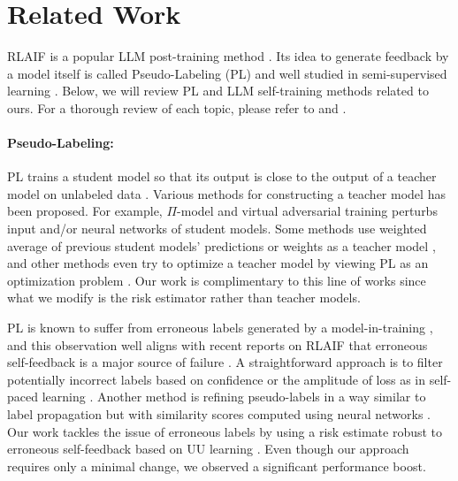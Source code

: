 \section{Related Work}

RLAIF is a popular LLM post-training method \citep{bai2022constitutional}.
Its idea to generate feedback by a model itself is called Pseudo-Labeling (PL) and well studied in semi-supervised learning \citep{scudder1965probability,lee2013pseudo}. Below, we will review PL and LLM self-training methods related to ours. For a thorough review of each topic, please refer to \citet{yang2023survey} and \citet{xiao2025foundations}.

\paragraph{Pseudo-Labeling:}
PL trains a student model so that its output is close to the output of a teacher model on unlabeled data \citep{scudder1965probability,lee2013pseudo}.
Various methods for constructing a teacher model has been proposed.
For example, $\Pi$-model \citep{bachman2014learning,sajjadi2016regularization,laine2017temporal} and virtual adversarial training \citep{miyato2019virtual} perturbs input and/or neural networks of student models.
Some methods use weighted average of previous student models' predictions or weights as a teacher model \citep{laine2017temporal,tarvainen2017mean}, and
other methods even try to optimize a teacher model by viewing PL as an optimization problem \citep{yi2019probabilistic,wang2020repetitive,pham2021meta}.
Our work is complimentary to this line of works since what we modify is the risk estimator rather than teacher models.

PL is known to suffer from erroneous labels generated by a model-in-training \citep{haase2021iterative,rizve2021in}, and this observation well aligns with recent reports on RLAIF that erroneous self-feedback is a major source of failure \citep{Madaan2023-fn}.
A straightforward approach is to filter potentially incorrect labels based on confidence \citep{sohn2020fixmatch,haase2021iterative,rizve2021in} or the amplitude of loss as in self-paced learning \citep{bengio2009curriculum,kumar2010self,jiang2015self}.
Another method is refining pseudo-labels in a way similar to label propagation \citep{zhu2002learning} but with similarity scores computed using neural networks \citep{kutt2024contrastive}.
Our work tackles the issue of erroneous labels by using a risk estimate robust to erroneous self-feedback based on UU learning \citep{Lu2019-sd,Lu2020-dx}. Even though our approach requires only a minimal change, we observed a significant performance boost.

